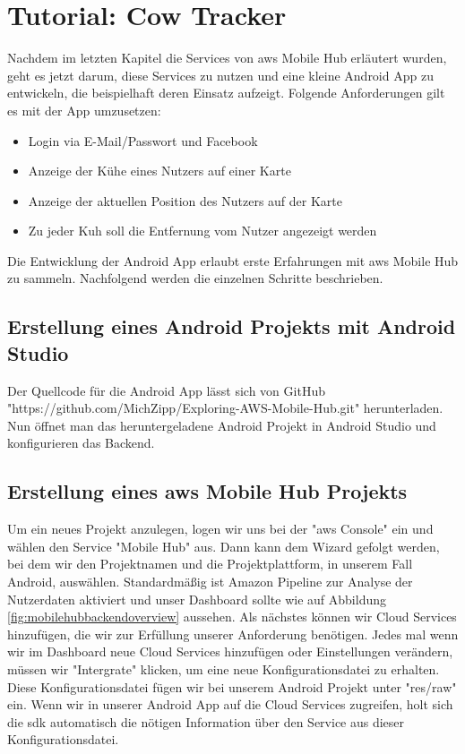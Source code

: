 \section{Tutorial: Cow Tracker}
Nachdem im letzten Kapitel die Services von \gls{aws} Mobile Hub erläutert wurden, geht es jetzt darum, diese Services zu nutzen und eine kleine Android App zu entwickeln, die beispielhaft deren Einsatz aufzeigt. Folgende Anforderungen gilt es mit der App umzusetzen:
\begin{itemize}
	\item Login via E-Mail/Passwort und Facebook
	\item Anzeige der Kühe eines Nutzers auf einer Karte
	\item Anzeige der aktuellen Position des Nutzers auf der Karte
	\item Zu jeder Kuh soll die Entfernung vom Nutzer angezeigt werden	 
\end{itemize}
Die Entwicklung der Android App erlaubt erste Erfahrungen mit \gls{aws} Mobile Hub zu sammeln. Nachfolgend werden die einzelnen Schritte beschrieben. 

\subsection{Erstellung eines Android Projekts mit Android Studio}
Der Quellcode für die Android App lässt sich von GitHub "https://github.com/MichZipp/Exploring-AWS-Mobile-Hub.git" herunterladen. Nun öffnet man das heruntergeladene Android Projekt in Android Studio und konfigurieren das Backend. 

\subsection{Erstellung eines \gls{aws} Mobile Hub Projekts}\label{erstellungmbprojekt}
Um ein neues Projekt anzulegen, logen wir uns bei der "\gls{aws} Console" ein und wählen den Service "Mobile Hub" aus. Dann kann dem Wizard gefolgt werden, bei dem wir den Projektnamen und die Projektplattform, in unserem Fall Android, auswählen. Standardmäßig ist Amazon Pipeline zur Analyse der Nutzerdaten aktiviert und unser Dashboard sollte wie auf Abbildung \ref{fig:mobilehubbackendoverview} aussehen. Als nächstes können wir Cloud Services hinzufügen, die wir zur Erfüllung unserer Anforderung benötigen. Jedes mal wenn wir im Dashboard neue Cloud Services hinzufügen oder Einstellungen verändern, müssen wir "Intergrate" klicken, um eine neue Konfigurationsdatei zu erhalten. Diese Konfigurationsdatei fügen wir bei unserem Android Projekt unter "res/raw" ein. Wenn wir in unserer Android App auf die Cloud Services zugreifen, holt sich die \gls{sdk} automatisch die nötigen Information über den Service aus dieser Konfigurationsdatei.


